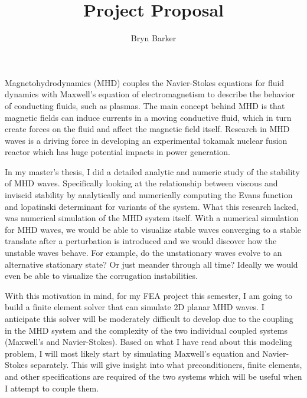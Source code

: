 \documentclass{article}
\begin{document}
\title{Project Proposal}
\author{Bryn Barker}

\maketitle

Magnetohydrodynamics (MHD) couples the Navier-Stokes equations for fluid dynamics with Maxwell’s equation of electromagnetism to describe the behavior of conducting fluids, such as plasmas. The main concept behind MHD is that magnetic fields can induce currents in a moving conductive fluid, which in turn create forces on the fluid and affect the magnetic field itself. Research in MHD waves is a driving force in developing an experimental tokamak nuclear fusion reactor which has huge potential impacts in power generation.

In my master's thesis, I did a detailed analytic and numeric study of the stability of MHD waves. Specifically looking at the relationship between viscous and inviscid stability by analytically and numerically computing the Evans function and lopatinski determinant for variants of the system. What this research lacked, was numerical simulation of the MHD system itself. With a numerical simulation for MHD waves, we would be able to visualize stable waves converging to a stable translate after a perturbation is introduced and we would discover how the unstable waves behave. For example, do the unstationary waves evolve to an alternative stationary state? Or just meander through all time? Ideally we would even be able to visualize the corrugation instabilities. 

With this motivation in mind, for my FEA project this semester, I am going to build a finite element solver that can simulate 2D planar MHD waves. I anticipate this solver will be moderately difficult to develop due to the coupling in the MHD system and the complexity of the two individual coupled systems (Maxwell's and Navier-Stokes). Based on what I have read about this modeling problem, I will most likely start by simulating Maxwell's equation and Navier-Stokes separately. This will give insight into what preconditioners, finite elements, and other specifications are required of the two systems which will be useful when I attempt to couple them. 
\end{document}
